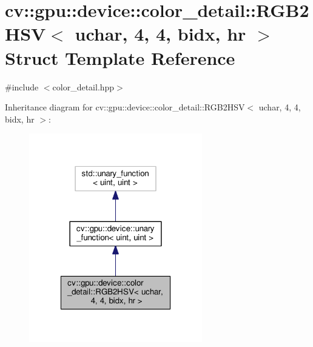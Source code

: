 \hypertarget{structcv_1_1gpu_1_1device_1_1color__detail_1_1RGB2HSV_3_01uchar_00_014_00_014_00_01bidx_00_01hr_01_4}{\section{cv\-:\-:gpu\-:\-:device\-:\-:color\-\_\-detail\-:\-:R\-G\-B2\-H\-S\-V$<$ uchar, 4, 4, bidx, hr $>$ Struct Template Reference}
\label{structcv_1_1gpu_1_1device_1_1color__detail_1_1RGB2HSV_3_01uchar_00_014_00_014_00_01bidx_00_01hr_01_4}
}


{\ttfamily \#include $<$color\-\_\-detail.\-hpp$>$}



Inheritance diagram for cv\-:\-:gpu\-:\-:device\-:\-:color\-\_\-detail\-:\-:R\-G\-B2\-H\-S\-V$<$ uchar, 4, 4, bidx, hr $>$\-:\nopagebreak
\begin{figure}[H]
\begin{center}
\leavevmode
\includegraphics[width=214pt]{structcv_1_1gpu_1_1device_1_1color__detail_1_1RGB2HSV_3_01uchar_00_014_00_014_00_01bidx_00_01hr_01_4__inherit__graph}
\end{center}
\end{figure}


